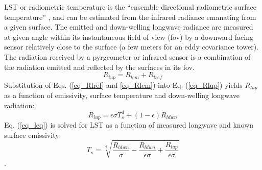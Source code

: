\documentclass[fleqn,10pt]{wlscirep}
\begin{document}
LST or radiometric temperature is the “ensemble directional radiometric surface temperature” \cite{norman1995terminology}, and can be estimated from the infrared radiance emanating from a given surface\cite{kustas2007utility}. The emitted and down-welling longwave radiance are measured at given angle within its instantaneous field of view (fov) by a downward facing sensor relatively close to the surface (a few meters for an eddy covariance tower). The radiation received by a pyrgeometer or infrared sensor is a combination of the radiation emitted and reflected by the surfaces in its fov. 
\begin{equation}\label{eq_Rlup}
R_{lup} = R_{lem} + R_{lref}
\end{equation}
Substitution of Eqs. (\ref{eq_Rlref} and \ref{eq_Rlem}) into Eq. (\ref{eq_Rlup}) yields $R_{lup}$ as a function of emissivity, surface temperature and down-welling longwave radiation:
\begin{equation}\label{eq_leq}
R_{lup}= \epsilon \sigma T_{s}^{4} + (1- \epsilon)R_{ldwn}
\end{equation}
Eq. (\ref{eq_leq}) is solved for LST as a function of measured longwave and known surface emissivity:
\begin{equation}\label{eq_Tleq}
T_{s} = \sqrt[4]{\frac{R_{ldwn}}{\sigma} - \frac{R_{ldwn}}{\epsilon \sigma} + \frac{R_{lup}}{\epsilon \sigma}}
\end{equation}
. %
\end{document}
